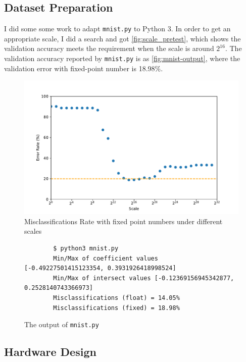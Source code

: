 
\subsection{Dataset Preparation}

I did some some work to adapt \nolinkurl{mnist.py} to Python 3.
In order to get an appropriate scale, I did a search and got \autoref{fig:scale_pretest}, which shows the validation accuracy meets the requirement when the scale is around \(2^{16}\).
The validation accuracy reported by \nolinkurl{mnist.py} is as \autoref{fig:mnist-output}, where the validation error with fixed-point number is 18.98\%.

\begin{figure}[ht!]
    \centering
    \includegraphics[scale=0.64]{images/scale_pretest.pdf}
    \caption{Misclassifications Rate with fixed point numbers under different scales}
    \label{fig:scale_pretest}
\end{figure}

\begin{figure}[ht!]
    \begin{verbatim}
        $ python3 mnist.py
        Min/Max of coefficient values [-0.49227501415123354, 0.3931926418998524]
        Min/Max of intersect values [-0.12369156945342877, 0.2528140743366973]
        Misclassifications (float) = 14.05%
        Misclassifications (fixed) = 18.98%
    \end{verbatim}
    \caption{The output of \nolinkurl{mnist.py}}
    \label{fig:mnist-output}
\end{figure}

\subsection{Hardware Design}


